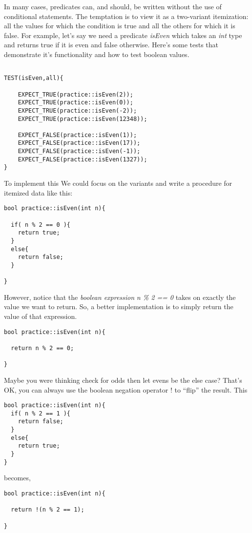 \documentclass[]{tufte-handout}
\begin{document}
In many cases, predicates can, and should, be written without the use of conditional statements. The temptation is to view it as a two-variant itemization: all the values for which the condition is true and all the others for which it is false. For example, let's say we need a predicate \textit{isEven} which takes an \textit{int} type and returns true if it is even and false otherwise.  Here's some tests that demonstrate it's functionality and how to test boolean values.
\begin{verbatim}

TEST(isEven,all){
	
	EXPECT_TRUE(practice::isEven(2));
	EXPECT_TRUE(practice::isEven(0));
	EXPECT_TRUE(practice::isEven(-2));	
	EXPECT_TRUE(practice::isEven(12348));

	EXPECT_FALSE(practice::isEven(1));
	EXPECT_FALSE(practice::isEven(17));
	EXPECT_FALSE(practice::isEven(-1));
	EXPECT_FALSE(practice::isEven(1327));		
}

\end{verbatim}



To implement this We could focus on the variants and write a procedure for itemized data like this:
\begin{verbatim}
bool practice::isEven(int n){
  
  if( n % 2 == 0 ){
    return true;
  }
  else{
    return false;
  }
  
}
\end{verbatim}

However, notice that the \textit{boolean expression} \textit{n \% 2 == 0} takes on exactly the value we want to return. So, a better implementation is to simply return the value of that expression.
\begin{verbatim}
bool practice::isEven(int n){
  
  return n % 2 == 0;

}
\end{verbatim}

Maybe you were thinking check for odds then let evens be the else case? That's OK, you can always use the boolean negation operator ! to ``flip'' the result. This

\begin{verbatim}
bool practice::isEven(int n){
  if( n % 2 == 1 ){
    return false;
  }
  else{
    return true;
  }
}
\end{verbatim}
becomes,
\begin{verbatim}
bool practice::isEven(int n){
  
  return !(n % 2 == 1);
  
}
\end{verbatim}
\end{document}
